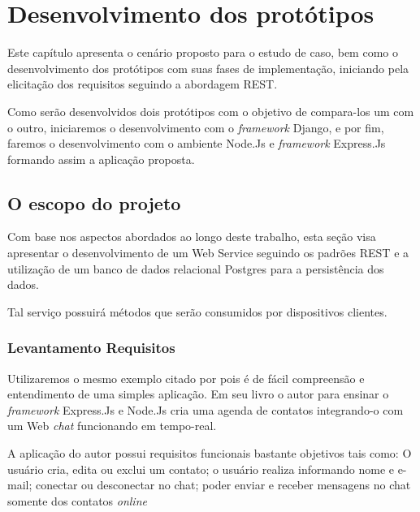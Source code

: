
\chapter{Desenvolvimento dos protótipos}
\label{desenvolvimento-prototipos}

\vspace{-1.9cm}


  Este capítulo apresenta o cenário proposto para o estudo de caso, bem
  como o desenvolvimento dos protótipos com suas fases de implementação, iniciando
  pela elicitação dos requisitos seguindo a abordagem \ac{REST}.
  
  Como serão desenvolvidos dois protótipos com o objetivo de compara-los um com o outro,
  iniciaremos o desenvolvimento com o \textit{framework} Django, e por fim, faremos o desenvolvimento
  com o ambiente Node.Js e \textit{framework} Express.Js formando assim a aplicação proposta.
  
\section{O escopo do projeto}
\label{escopo-projeto}

  Com base nos aspectos abordados ao longo deste trabalho, 
  esta seção visa apresentar o desenvolvimento de um Web Service seguindo os padrões \ac{REST} e a utilização 
  de um banco de dados relacional Postgres para a persistência dos dados.
  
  Tal serviço possuirá métodos que serão consumidos por dispositivos clientes.

\subsection{Levantamento Requisitos}
\label{levantamento-requisitos}

  Utilizaremos o mesmo exemplo citado por  pois é de fácil compreensão
  e entendimento de uma simples aplicação. Em seu livro o autor para ensinar o \textit{framework}
  Express.Js e Node.Js cria uma agenda de contatos integrando-o com um Web \textit{chat} funcionando em tempo-real.
  
  A aplicação do autor possui requisitos funcionais bastante objetivos tais como: O usuário cria, edita ou exclui um contato; 
  o usuário realiza  informando nome e e-mail; conectar ou desconectar no chat; poder enviar e receber mensagens no chat somente
  dos contatos \textit{online}
  
